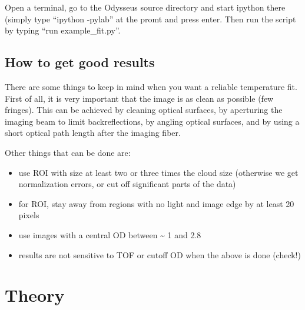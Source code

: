 \documentclass[letterpaper,10pt,english]{manual}
\begin{document}
Open a terminal, go to the Odysseus source directory and start ipython there (simply type ``ipython -pylab'' at the promt and press enter. Then run the script by typing ``run example\_fit.py''.


\subsection{How to get good results}

There are some things to keep in mind when you want a reliable temperature fit. First of all, it is very important that the image is as clean as possible (few fringes). This can be achieved by cleaning optical surfaces, by aperturing the imaging beam to limit backreflections, by angling optical surfaces, and by using a short optical path length after the imaging fiber.

Other things that can be done are:
\begin{itemize}
\item {} 
use ROI with size at least two or three times the cloud size (otherwise we get normalization errors, or cut off significant parts of the data)

\item {} 
for ROI, stay away from regions with no light and image edge by at least 20 pixels

\item {} 
use images with a central OD between \textasciitilde{} 1 and 2.8

\item {} 
results are not sensitive to TOF or cutoff OD when the above is done (check!)

\end{itemize}

\resetcurrentobjects


\section{Theory}
\end{document}
